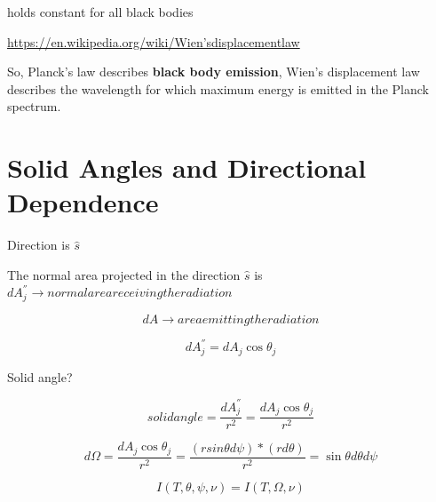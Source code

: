\documentclass[12pt]{article}
\renewcommand{\_}{\kern-1.5pt\textunderscore\kern-1.5pt}
\begin{document}
\begin{itemize}

  holds constant for all black bodies\par

\href{https://en.wikipedia.org/wiki/Wien's_displacement_law}{https://en.wikipedia.org/wiki/Wien's\_displacement\_law}\par

So, Planck’s law describes \textbf{black body emission}, Wien’s displacement law describes the wavelength for which maximum energy is emitted in the Planck spectrum. \par


\vspace{\baselineskip}

\end{itemize}\section*{Solid Angles and Directional Dependence}
\par

Direction is  \( \hat{s} \) \par

The normal area projected in the direction  \( \hat{s} \)  is  \( dA_{j}^{''} \rightarrow normal area receiving the radiation \) \par

 \[ dA \rightarrow area emitting the radiation \] \par

 \[ dA_{j}^{''}=dA_{j}\cos  \theta _{j} \] \par

Solid angle?\par

 \[ solid angle=\frac{dA_{j}^{''}}{r^{2}}=\frac{dA_{j}\cos  \theta _{j}}{r^{2}} \] \par

 \[ d \Omega =\frac{dA_{j}\cos  \theta _{j}}{r^{2}}=\frac{ \left( r sin \theta  d \psi  \right) \ast \left( r d \theta  \right) }{r^{2}}=\sin  \theta d \theta  d \psi  \] \par

 \[ I \left( T, \theta , \psi , \nu  \right) =I \left( T, \Omega , \nu  \right)  \] \par

\par

\par
\end{document}
